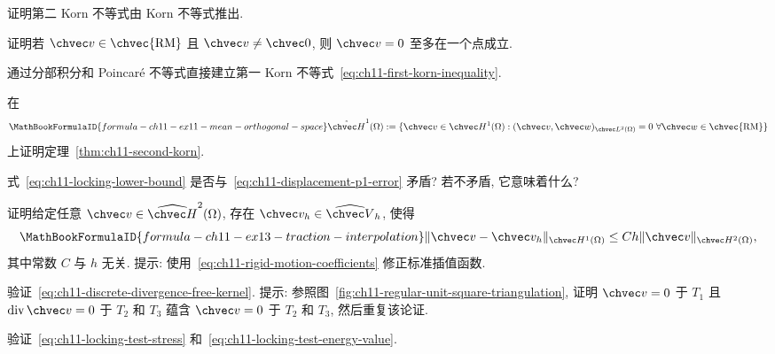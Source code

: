 \begin{MBExercise}
\label{exr:ch11-08}
证明第二 Korn 不等式由 Korn 不等式推出.
\end{MBExercise}

\begin{MBExercise}
\label{exr:ch11-rigid-motion-zero-set}
证明若 $\chvec v\in\chvec{\mathrm{RM}}$ 且 $\chvec v\neq\chvec0$, 则 $\chvec v=0$ 至多在一个点成立.
\end{MBExercise}

\begin{MBExercise}
\label{exr:ch11-10}
通过分部积分和 Poincaré 不等式直接建立第一 Korn 不等式~\eqref{eq:ch11-first-korn-inequality}.
\end{MBExercise}

\begin{MBExercise}
\label{exr:ch11-11}
在
\[
\MathBookFormulaID{formula-ch11-ex11-mean-orthogonal-space}
\mathring{\chvec H}^1(\Omega):=
\{\chvec v\in\chvec H^1(\Omega):
(\chvec v,\chvec w)_{\chvec L^2(\Omega)}=0
\ \forall\chvec w\in\chvec{\mathrm{RM}}\}
\]
上证明定理~\ref{thm:ch11-second-korn}.
\end{MBExercise}

\begin{MBExercise}
\label{exr:ch11-12}
式~\eqref{eq:ch11-locking-lower-bound} 是否与~\eqref{eq:ch11-displacement-p1-error} 矛盾? 若不矛盾, 它意味着什么?
\end{MBExercise}

\begin{MBExercise}
\label{exr:ch11-traction-interpolant}
证明给定任意 $\chvec v\in\widehat{\chvec H}^2(\Omega)$, 存在 $\chvec v_h\in\widehat{\chvec V}_h$, 使得
\[
\MathBookFormulaID{formula-ch11-ex13-traction-interpolation}
\|\chvec v-\chvec v_h\|_{\chvec H^1(\Omega)}
\leq Ch\|\chvec v\|_{\chvec H^2(\Omega)},
\]
其中常数 $C$ 与 $h$ 无关. 提示: 使用~\eqref{eq:ch11-rigid-motion-coefficients} 修正标准插值函数.
\end{MBExercise}

\begin{MBExercise}
\label{exr:ch11-discrete-divergence-kernel}
验证~\eqref{eq:ch11-discrete-divergence-free-kernel}. 提示: 参照图~\ref{fig:ch11-regular-unit-square-triangulation}, 证明 $\chvec v=0$ 于 $T_1$ 且 $\operatorname{div}\chvec v=0$ 于 $T_2$ 和 $T_3$ 蕴含 $\chvec v=0$ 于 $T_2$ 和 $T_3$, 然后重复该论证.
\end{MBExercise}

\begin{MBExercise}
\label{exr:ch11-15}
验证~\eqref{eq:ch11-locking-test-stress} 和~\eqref{eq:ch11-locking-test-energy-value}.
\end{MBExercise}

